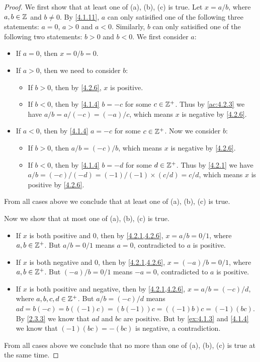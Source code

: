 \begin{proof}
  We first show that at least one of (a), (b), (c) is true.
  Let \(x = a / b\), where \(a, b \in \mathbb{Z}\) and \(b \neq 0\).
  By \cref{4.1.11}, \(a\) can only satisified one of the following three statements:
  \(a = 0\), \(a > 0\) and \(a < 0\).
  Similarly, \(b\) can only satisified one of the following two statements:
  \(b > 0\) and \(b < 0\).
  We first consider \(a\):
  \begin{itemize}
    \item If \(a = 0\), then \(x = 0 / b = 0\).
    \item If \(a > 0\), then we need to consider \(b\):
          \begin{itemize}
            \item If \(b > 0\), then by \cref{4.2.6}, \(x\) is positive.
            \item If \(b < 0\), then by \cref{4.1.4} \(b = -c\) for some \(c \in \mathbb{Z}^+\).
                  Thus by \cref{ac:4.2.3} we have \(a / b = a / (-c) = (-a) / c\), which means \(x\) is negative by \cref{4.2.6}.
          \end{itemize}
    \item If \(a < 0\), then by \cref{4.1.4} \(a = -c\) for some \(c \in \mathbb{Z}^+\).
          Now we consider \(b\):
          \begin{itemize}
            \item If \(b > 0\), then \(a / b = (-c) / b\), which means \(x\) is negative by \cref{4.2.6}.
            \item If \(b < 0\), then by \cref{4.1.4} \(b = -d\) for some \(d \in \mathbb{Z}^+\).
                  Thus by \cref{4.2.1} we have \(a / b = (-c) / (-d) = (-1) / (-1) \times (c / d) = c / d\), which means \(x\) is positive by \cref{4.2.6}.
          \end{itemize}
  \end{itemize}
  From all cases above we conclude that at least one of (a), (b), (c) is true.

  Now we show that at most one of (a), (b), (c) is true.
  \begin{itemize}
    \item If \(x\) is both positive and \(0\), then by \cref{4.2.1,4.2.6}, \(x = a / b = 0 / 1\), where \(a, b \in \mathbb{Z}^+\).
          But \(a / b = 0 / 1\) means \(a = 0\), contradicted to \(a\) is positive.
    \item If \(x\) is both negative and \(0\), then by \cref{4.2.1,4.2.6}, \(x = (-a) / b = 0 / 1\), where \(a, b \in \mathbb{Z}^+\).
          But \((-a) / b = 0 / 1\) means \(-a = 0\), contradicted to \(a\) is positive.
    \item If \(x\) is both positive and negative, then by \cref{4.2.1,4.2.6}, \(x = a / b = (-c) / d\), where \(a, b, c, d \in \mathbb{Z}^+\).
          But \(a / b = (-c) / d\) means \(ad = b(-c) = b((-1)c) = (b(-1))c = ((-1)b)c = (-1)(bc)\).
          By \cref{2.3.3} we know that \(ad\) and \(bc\) are positive.
          But by \cref{ex:4.1.3} and \cref{4.1.4} we know that \((-1)(bc) = -(bc)\) is negative, a contradiction.
  \end{itemize}
  From all cases above we conclude that no more than one of (a), (b), (c) is true at the same time.
\end{proof}

